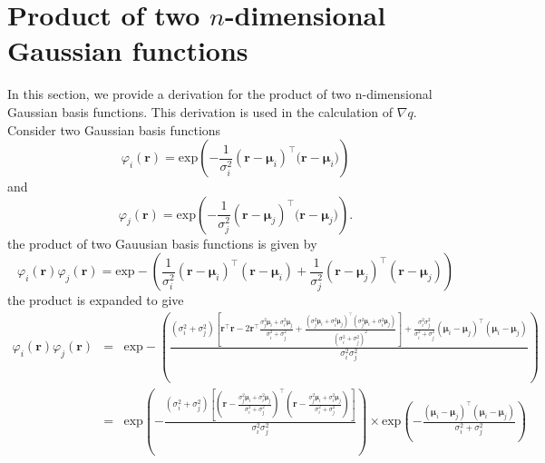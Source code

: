 \documentclass[]{article}
\begin{document}
\ifpdf
{}
\else
{}
\fi

\renewcommand{\theequation}{S1.\arabic{equation}}
\section*{Product of two $n$-dimensional Gaussian functions}\label{sec:GaussianProduct} 
In this section, we provide a derivation for the product of two n-dimensional Gaussian basis functions.
This derivation is used in the  calculation of $\nabla 	q$. Consider two
Gaussian basis functions
\begin{equation}\label{eq:n_dimensional_Gaussian1}
 \varphi_i(\mathbf r)=\mathrm{exp}\left({-\frac{1}{\sigma_i^2} (\mathbf r-\boldsymbol \mu_i)^\top(\mathbf r-\boldsymbol \mu_i})\right)
\end{equation}
and 
\begin{equation}\label{eq:n_dimensional_Gaussian2}
\varphi_j(\mathbf r)=\mathrm{exp}\left({-\frac{1}{\sigma_j^2} (\mathbf r-\boldsymbol \mu_j)^\top(\mathbf r-\boldsymbol \mu_j})\right).
\end{equation}
the product of two Gauusian basis functions is given by
\begin{equation}
 \varphi_i(\mathbf r)\varphi_j(\mathbf r)=\mathrm{exp}-\left({\frac{1}{\sigma_i^2} (\mathbf r-\boldsymbol \mu_i)^\top(\mathbf r-\boldsymbol\mu_i)+{\frac{1}{\sigma_j^2} (\mathbf r-\boldsymbol \mu_j)^\top(\mathbf r-\boldsymbol\mu_j)}}\right)
\end{equation}
the product is expanded to give
\begin{equation}
\begin{array}{ccc}
 
 \varphi_i(\mathbf r)\varphi_j(\mathbf r)&=&\mathrm{exp}-\left(\frac{(\sigma_i^2+\sigma_j^2)\left[\mathbf r^\top\mathbf r-2\mathbf r^\top \frac{\sigma_j^2\boldsymbol\mu_i+\sigma_i^2\boldsymbol\mu_j}{\sigma_i^2+\sigma_j^2}+\frac{(\sigma_j^2\boldsymbol\mu_i+\sigma_i^2\boldsymbol\mu_j)^\top(\sigma_j^2\boldsymbol\mu_i+\sigma_i^2\boldsymbol\mu_j)}{(\sigma_i^2+\sigma_j^2)^2}   \right]  +\frac{\sigma_i^2\sigma_j^2}{\sigma_i^2+\sigma_j^2}(\boldsymbol \mu_i-\boldsymbol\mu_j)^\top(\boldsymbol \mu_i-\boldsymbol\mu_j) }{\sigma_i^2\sigma_j^2}\right)\\
&=&\mathrm{exp}\left(-\frac{(\sigma_i^2+\sigma_j^2)\left[(\mathbf r-\frac{\sigma_j^2\boldsymbol\mu_i+\sigma_i^2\boldsymbol\mu_j}{\sigma_i^2+\sigma_j^2})^\top(\mathbf r-\frac{\sigma_j^2\boldsymbol\mu_i+\sigma_i^2\boldsymbol\mu_j}{\sigma_i^2+\sigma_j^2})\right]  }{\sigma_i^2\sigma_j^2}\right)
\times\mathrm{exp}\left(-\frac{(\boldsymbol \mu_i-\boldsymbol\mu_j)^\top(\boldsymbol \mu_i-\boldsymbol\mu_j)}{\sigma_i^2+\sigma_j^2}\right)
\end{array}
\end{equation}
\end{document}
